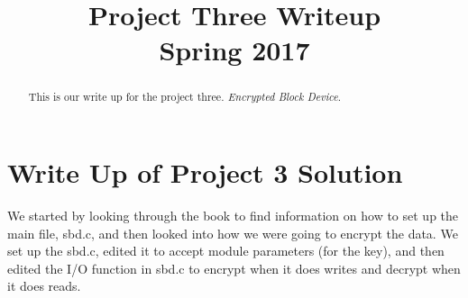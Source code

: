 
\usepackage[T1]{fontenc}
\usepackage{geometry}
\geometry{textwidth=10cm}
\sffamily

\title{
	Project Three Writeup \\
    {
    	\LARGE Spring 2017 
    }
}
\author{
}



\maketitle
\begin{abstract}
  This is our write up for the project three. \textit{Encrypted Block Device}.
\end{abstract}

\clearpage

\section{Write Up of Project 3 Solution} We started by looking through the book to find information on how to set up the main file, sbd.c, and then looked into how we were going to encrypt the data. We set up the sbd.c, edited it to accept module parameters (for the key), and then edited the I/O function in sbd.c to encrypt when it does writes and decrypt when it does reads. 

